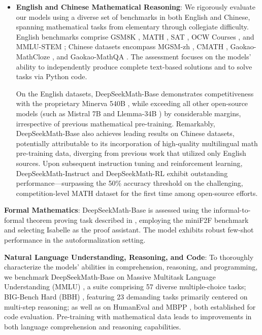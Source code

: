 \begin{itemize}[topsep=0pt]
    \item \textbf{English and Chinese Mathematical Reasoning}: We rigorously evaluate our models using a diverse set of benchmarks in both English and Chinese, spanning mathematical tasks from elementary through collegiate difficulty. English benchmarks comprise GSM8K \citep{gsm8k}, MATH \citep{MATH}, SAT \citep{llemma}, OCW Courses \citep{minerva}, and MMLU-STEM \citep{mmlu}; Chinese datasets encompass MGSM-zh \citep{mgsm}, CMATH \citep{wei2023cmath}, Gaokao-MathCloze \citep{agieval}, and Gaokao-MathQA \citep{agieval}. The assessment focuses on the models’ ability to independently produce complete text-based solutions and to solve tasks via Python code.
    
    On the English datasets, DeepSeekMath-Base demonstrates competitiveness with the proprietary Minerva 540B \citep{minerva}, while exceeding all other open-source models (such as Mistral 7B \citep{mistral} and Llemma-34B \citep{llemma}) by considerable margins, irrespective of previous mathematical pre-training. Remarkably, DeepSeekMath-Base also achieves leading results on Chinese datasets, potentially attributable to its incorporation of high-quality multilingual math pre-training data, diverging from previous work \citep{minerva,llemma} that utilized only English sources. Upon subsequent instruction tuning and reinforcement learning, DeepSeekMath-Instruct and DeepSeekMath-RL exhibit outstanding performance—surpassing the 50\% accuracy threshold on the challenging, competition-level MATH dataset for the first time among open-source efforts.
\end{itemize}

\item \textbf{Formal Mathematics}: DeepSeekMath-Base is assessed using the informal-to-formal theorem proving task described in \citep{dsp_proof}, employing the miniF2F benchmark \citep{minif2f} and selecting Isabelle \citep{isabelle} as the proof assistant. The model exhibits robust few-shot performance in the autoformalization setting.

\item \textbf{Natural Language Understanding, Reasoning, and Code}: To thoroughly characterize the models’ abilities in comprehension, reasoning, and programming, we benchmark DeepSeekMath-Base on Massive Multitask Language Understanding (MMLU) \citep{mmlu}, a suite comprising 57 diverse multiple-choice tasks; BIG-Bench Hard (BBH) \citep{bbh}, featuring 23 demanding tasks primarily centered on multi-step reasoning; as well as on HumanEval \citep{codex} and MBPP \citep{mbpp}, both established for code evaluation. Pre-training with mathematical data leads to improvements in both language comprehension and reasoning capabilities.

